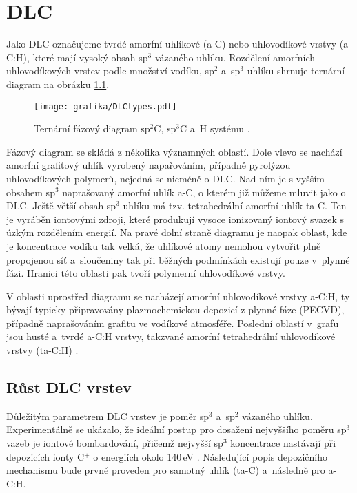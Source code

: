 \chapter{DLC}
Jako DLC označujeme tvrdé amorfní uhlíkové (a-C) nebo uhlovodíkové vrstvy (a-C:H), které mají vysoký obsah sp$^3$ vázaného uhlíku. Rozdělení amorfních uhlovodíkových vrstev podle množství vodíku, sp$^2$ a~sp$^3$ uhlíku shrnuje ternární diagram na obrázku \ref{DLCtypes}.

\begin{figure}[btp]
  \centering
  \texttt{[image: grafika/DLCtypes.pdf]}
  \caption{Ternární fázový diagram sp$^2$C, sp$^3$C a~H systému \cite{Robertson2002}.}
  \label{DLCtypes}
\end{figure}

Fázový diagram se skládá z několika významných oblastí. Dole vlevo se nachází amorfní grafitový uhlík vyrobený napařováním, případně pyrolýzou uhlovodíkových polymerů, nejedná se nicméně o DLC. Nad ním je s vyšším obsahem sp$^3$ naprašovaný amorfní uhlík a-C, o kterém již můžeme mluvit jako o DLC. Ještě větší obsah sp$^3$ uhlíku má tzv. tetrahedrální amorfní uhlík ta-C. 
Ten je vyráběn iontovými zdroji, které produkují vysoce ionizovaný iontový svazek s úzkým rozdělením energií. Na pravé dolní straně diagramu je naopak oblast, kde je koncentrace vodíku tak velká, že uhlíkové atomy nemohou vytvořit plně propojenou síť a~sloučeniny tak při běžných podmínkách existují pouze v~plynné fázi. 
Hranici této oblasti pak tvoří polymerní uhlovodíkové vrstvy. 

V oblasti uprostřed diagramu se nacházejí amorfní uhlovodíkové vrstvy a-C:H, ty bývají typicky připravovány plazmochemickou depozicí z plynné fáze (PECVD), případně naprašováním grafitu ve vodíkové atmosféře. Poslední oblastí v~grafu jsou husté a~tvrdé a-C:H vrstvy, takzvané amorfní tetrahedrální uhlovodíkové vrstvy (ta-C:H) \cite{Donnet2008a}.    


\section{Růst DLC vrstev}
Důležitým parametrem DLC vrstev je poměr sp$^3$ a~sp$^2$ vázaného uhlíku. Experimentálně se ukázalo, že ideální postup pro dosažení nejvyššího poměru sp$^3$ vazeb je iontové bombardování, přičemž nejvyšší sp$^3$ koncentrace nastávají při depozicích ionty C$^+$ o energiích okolo 140\,eV \cite{Fallon1993}. Následující popis depozičního mechanismu bude prvně proveden pro samotný uhlík (ta-C) a~následně pro a-C:H.

